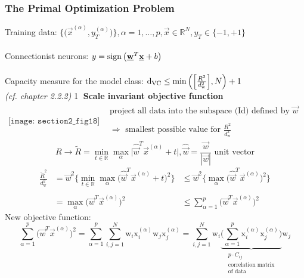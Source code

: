 \subsubsection{The Primal Optimization Problem}
Training data: $\Big\{ \Big( \vec{x}^{(\alpha)}, y_T^{(\alpha)} \Big) \Big\},\alpha = 1, \ldots, p, \vec{x} \in \mathbb{R}^N, y_T \in \{-1, +1\}$ 
\\\\
Connectionist neurons: $ y = \operatorname{sign} \big( \underline{\mathbf{w}}^T \underline{\mathbf{x}} + b \big)$ 
\\\\
Capacity measure for the model class: $\mathrm{d}_{\mathrm{VC}} \leq \min \Big( \Big[ \frac{R^2}{d_{\mathrm{w}}^2} \Big], N \Big) + 1$ \\
{\it (cf. chapter 2.2.2) }
\newpage					%
\noindent \textcircled{1} {\bf Scale invariant objective function}
\[ \begin{array}{ll}
	\texttt{[image: section2\_fig18]}
	& \begin{array}{l}
		\text{project all data into the subspace (Id) defined by }
		\vec{w} \\\\
		\Rightarrow \text{ smallest possible value for }
		\frac{R^2}{d_{\mathrm{w}}^2}
	\end{array}
\end{array} \] 
\begin{equation}
	R \rightarrow \widetilde{R} = \min\limits_{t \in \mathbb{R}} 
		\max\limits_\alpha \Big| \widehat{\vec{w}}^T
		\vec{x}^{(\alpha)} + t \Big|, 
	\widehat{\vec{w}} = \frac{\vec{w}}{|\vec{w}|} \text{ unit vector}
\end{equation}
\begin{equation}
	\begin{array}{lll}
	\frac{\widetilde{R}^2}{d_{\mathrm{w}}^2}  
	& = \vec{w}^2 \bigg\{ \min\limits_{t \in \mathbb{R}} \max\limits_\alpha
		\Big( \widehat{\vec{w}}^T \vec{x}^{(\alpha)} + t \Big)^2
		\bigg\}
	& \leq \vec{w}^2 \bigg\{ \max\limits_\alpha 
		\Big(\widehat{\vec{w}}^T \vec{x}^{(\alpha)} \Big)^2
		\bigg\} \\\\
	& = \max\limits_\alpha \Big( \vec{w}^T \vec{x}^{(\alpha)} \Big)^2
	& \leq \sum\limits_{\alpha = 1}^p \Big( \vec{w}^T
		\vec{x}^{(\alpha)} \Big)^2
	\end{array}
\end{equation}
New objective function:
\begin{equation}
	\sum\limits_{\alpha = 1}^p \Big( \vec{w}^T \vec{x}^{(\alpha)}
		\Big)^2 
	= \sum\limits_{\alpha = 1}^p \sum\limits_{i,j = 1}^N \mathrm{w}_i
		\mathrm{x}_i^{(\alpha)} \mathrm{w}_j 
		\mathrm{x}_j^{(\alpha)}
	= \sum\limits_{i,j = 1}^N \mathrm{w}_i
		\underbrace{ \bigg( \sum\limits_{\alpha = 1}^p 
			\mathrm{x}_i^{(\alpha)} \mathrm{x}_j^{(\alpha)}
			\bigg) }_{\substack{ p \cdot C_{ij} \\
				\text{correlation matrix} \\
				\text{of data} }}
			\mathrm{w}_j
\end{equation}
